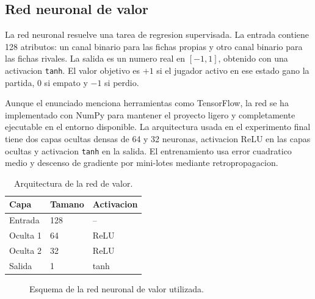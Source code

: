 \documentclass[conference,a4paper]{IEEEtran}
\begin{document}
\subsection{Red neuronal de valor}

La red neuronal resuelve una tarea de regresion supervisada. La entrada contiene
128 atributos: un canal binario para las fichas propias y otro canal binario
para las fichas rivales. La salida es un numero real en \([-1, 1]\), obtenido con
una activacion \texttt{tanh}. El valor objetivo es \(+1\) si el jugador activo en
ese estado gano la partida, \(0\) si empato y \(-1\) si perdio.

Aunque el enunciado menciona herramientas como TensorFlow, la red se ha
implementado con NumPy para mantener el proyecto ligero y completamente
ejecutable en el entorno disponible. La arquitectura usada en el experimento
final tiene dos capas ocultas densas de 64 y 32 neuronas, activacion ReLU en las
capas ocultas y activacion \texttt{tanh} en la salida. El entrenamiento usa error
cuadratico medio y descenso de gradiente por mini-lotes mediante
retropropagacion.

\begin{table}[h]
\centering
\caption{Arquitectura de la red de valor.}
\label{tab:red}
\begin{tabular}{lll}
\toprule
Capa & Tamano & Activacion \\
\midrule
Entrada & 128 & -- \\
Oculta 1 & 64 & ReLU \\
Oculta 2 & 32 & ReLU \\
Salida & 1 & tanh \\
\bottomrule
\end{tabular}
\end{table}

\begin{figure}[t]
\centering
{}
\caption{Esquema de la red neuronal de valor utilizada.}
\label{fig:red-valor}
\end{figure}
\end{document}
